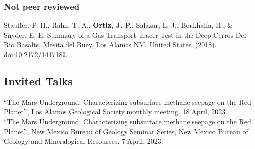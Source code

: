 \documentclass[11pt, letterpaper]{article}
\newcommand{\amper}{{\fontspec[Scale=.95]{Adobe Caslon Pro}\selectfont\itshape\&}}
\newcommand{\years}[1]{\marginnote{\scriptsize #1}}
\begin{document}
\subsubsection*{Not peer reviewed}
%
\years{2018}Stauffer, P. H., Rahn, T. A., \textbf{Ortiz, J. P.}, Salazar, L.
J., Boukhalfa, H., \& Snyder, E. E. Summary of a Gas Transport Tracer Test in
the Deep Cerros Del Rio Basalts, Mesita del Buey, Los Alamos NM. United States.
(2018). \href{https://www.osti.gov/servlets/purl/1417180}{doi:10.2172/1417180}.
\LosAlamosNationalLabOOOOSummaryofaGasTranspo\\
%

\hypersetup{linkcolor=black,citecolor=blue,filecolor=black,urlcolor=blue} 


\subsection*{Invited Talks}
\label{sec:invitedTalks}
\years{2023} ``The Mars Underground: Characterizing subsurface methane seepage
on the Red Planet'', Los Alamos Geological Society monthly meeting. 18 April,
2023.\\ 
%
\years{2023} ``The Mars Underground: Characterizing subsurface methane seepage
on the Red Planet'', New Mexico Bureau of Geology Seminar Series, New
Mexico Bureau of Geology and Mineralogical Resources. 7 April, 2023.\\
%



\end{document}
